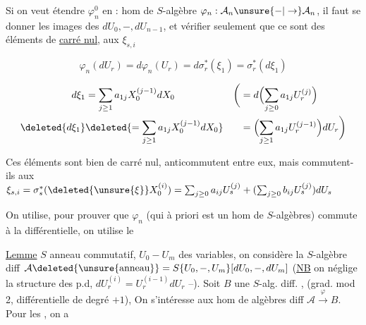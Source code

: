 
Si on veut étendre $\varphi_n^0$ en  : hom de $S$-algèbre $\varphi_n:\mathcal A_n\unsure{-|\to}\mathcal A_n$, il faut se donner les images des $dU_0,-,dU_{n-1}$, et vérifier seulement que ce sont des éléments de \uline{carré nul},   aux $\xi_{s,i}$

\[
\varphi_n(dU_r)=d\varphi_n(U_r)=d\sigma_r^*(\xi_1)=\sigma_r^*(d\xi_1)
\]

\[
\begin{aligned}
 d\xi_1&=\sum_{j\geq1}a_{1j}X_0^{(j-1)}dX_0
 &\biggl(&=d\Bigl(\sum_{j\geq0}a_{1j}U_r^{(j)}\Bigr)\\
 \deleted{d\xi_1}&\deleted{=\sum_{j\geq1}a_{1j}X_0^{(j-1)}dX_0}
 &&=\Bigl(\sum_{j\geq1}a_{1j}U_r^{(j-1)}\Bigr)dU_r\biggr)
\end{aligned}
\]

Ces éléments sont bien de carré nul, anticommutent entre eux, mais commutent-ils aux $\xi_{s,i}=\sigma_s^*(\deleted{\unsure{\xi}}X_0^{(i)})=\sum_{j\geq0}a_{ij}U_s^{(j)}+(\sum_{j\geq0}b_{ij}U_s^{(j)})dU_s$



On utilise, pour prouver que $\varphi_n$ (qui à priori est un hom de $S$-algèbres) commute à la différentielle, on utilise le

\uline{Lemme} $S$ anneau commutatif, $U_0-U_m$ des variables, on considère la $S$-algèbre diff $\mathcal A\deleted{\unsure{\text{anneau}}}=S\{U_0,-,U_m\}[dU_0,-,dU_m]$ (\uline{NB} on néglige la structure des p.d,  $dU_r^{(i)}=U_r^{(i-1)}dU_r$ --). Soit $B$ une $S$-alg. diff. , (grad. mod 2, différentielle de degré $+1$), On s'intéresse aux hom de algèbres diff $\mathcal A\xrightarrow{\varphi} B$. Pour les , on a

